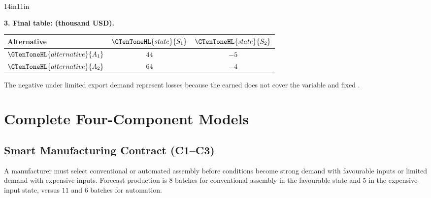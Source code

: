 \begin{CalculationLandscape}{14in}{11in}
\noindent\begin{minipage}{\linewidth}
\textbf{3. Final  table:  (thousand USD).}
\begin{center}
\begin{tabular}{@{}lcc@{}}
\toprule
Alternative & \(\GTenToneHL{state}{S_1}\) & \(\GTenToneHL{state}{S_2}\) \\
\midrule
\(\GTenToneHL{alternative}{A_1}\) & \(44\) & \(-5\) \\
\(\GTenToneHL{alternative}{A_2}\) & \(64\) & \(-4\) \\
\bottomrule
\end{tabular}
\end{center}
\end{minipage}


	The negative  under limited export demand represent losses because
	the  earned does not cover the variable and fixed .


\end{CalculationLandscape}


	\section{Complete Four-Component Models}
	\label{sec:complete-four-component-models}


	\subsection{Smart Manufacturing Contract (C1--C3)}
	\label{sec:problem19-smart-manufacturing-contract-c1-c3}

	A manufacturer must select conventional or automated assembly before conditions become strong demand with favourable inputs or limited demand with expensive inputs. Forecast production is \(8\) batches for conventional assembly in the favourable state and \(5\) in the expensive-input state, versus \(11\) and \(6\) batches for automation.

